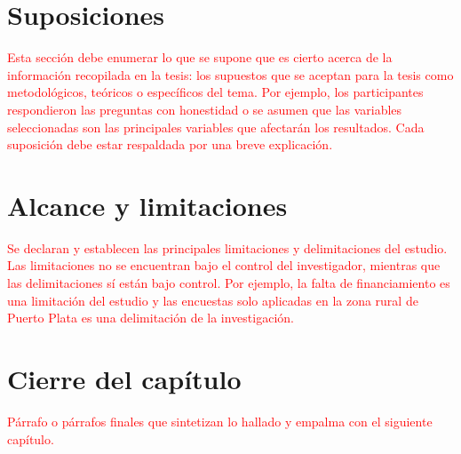 \section{Suposiciones}

\textcolor{red}{Esta sección debe enumerar lo que se supone que es cierto acerca de la información recopilada en la tesis: los supuestos que se aceptan para la tesis como metodológicos, teóricos o específicos del tema. Por ejemplo, los participantes respondieron las preguntas con honestidad o se asumen que las variables seleccionadas son las principales variables que afectarán los resultados. Cada suposición debe estar respaldada por una breve explicación.}

\section{Alcance y  limitaciones}

\textcolor{red}{Se declaran y establecen las principales limitaciones y delimitaciones del estudio. Las limitaciones no 
se encuentran bajo el control del investigador, mientras que las delimitaciones sí están bajo control. Por ejemplo, la 
falta de financiamiento es una limitación del estudio y las encuestas solo aplicadas en la zona rural de Puerto Plata es 
una delimitación de la investigación.}

\section{Cierre del capítulo}
\textcolor{red}{Párrafo o párrafos finales que sintetizan lo hallado y empalma con el siguiente capítulo.}
